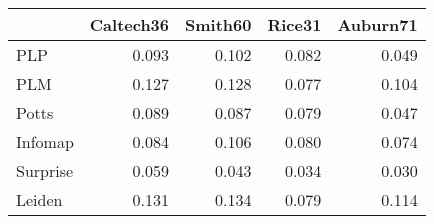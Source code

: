 \begin{tabular}{lrrrr}
\toprule
{} & Caltech36 & Smith60 & Rice31 & Auburn71 \\
\midrule
PLP      &     0.093 &   0.102 &  0.082 &    0.049 \\
PLM      &     0.127 &   0.128 &  0.077 &    0.104 \\
Potts    &     0.089 &   0.087 &  0.079 &    0.047 \\
Infomap  &     0.084 &   0.106 &  0.080 &    0.074 \\
Surprise &     0.059 &   0.043 &  0.034 &    0.030 \\
Leiden   &     0.131 &   0.134 &  0.079 &    0.114 \\
\bottomrule
\end{tabular}

